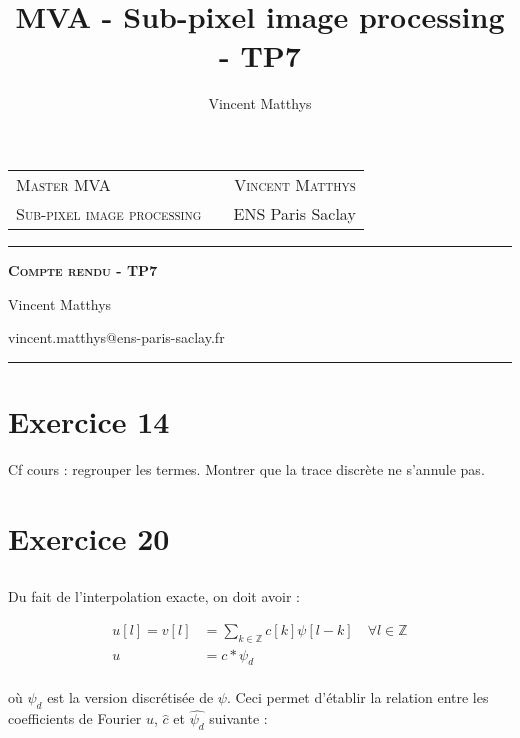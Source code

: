\documentclass[12pt,a4paper,onecolumn]{article}
\title{MVA - Sub-pixel image processing - TP7}
\author{Vincent Matthys}
\begin{document}
\begin{tabularx}{0.9\textwidth}{@{} l X r @{} }
	{\textsc{Master MVA}}               &  & \textsc{Vincent Matthys} \\
	\textsc{Sub-pixel image processing} &  & {ENS Paris Saclay}       \\
\end{tabularx}
\vspace{1.5cm}
\begin{center}

	\rule[11pt]{5cm}{0.5pt}

	\textbf{\LARGE \textsc{Compte rendu - TP7}}
	\vspace{0.5cm}

	Vincent Matthys

	vincent.matthys@ens-paris-saclay.fr

	\rule{5cm}{0.5pt}

	\vspace{1.5cm}
\end{center}

\setcounter{section}{13}
\section{Exercice 14}

Cf cours : regrouper les termes. Montrer que la trace discrète ne s'annule pas.


\setcounter{section}{19}
\section{Exercice 20}

\subsection{}

Du fait de l'interpolation exacte, on doit avoir :

\begin{equation*}
	\begin{aligned}
		u[l] = v[l] & = \sum_{k\in\mathbb{Z}}c[k]\psi[l-k] \quad \forall l \in \mathbb{Z} \\
		u           & = c * \psi_d                                                        \\
	\end{aligned}
\end{equation*}

où \(\psi_d\) est la version discrétisée de \(\psi\). Ceci permet d'établir la relation entre les coefficients de Fourier \(\widehat{u}\), \(\widehat{c}\) et \(\widehat{\psi_d}\) suivante :
\end{document}
